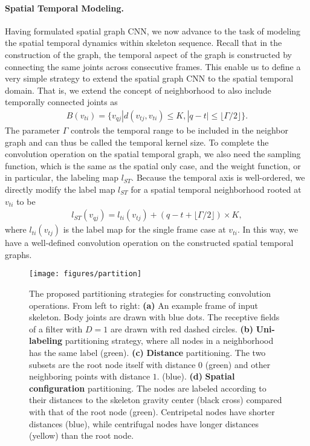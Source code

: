 \documentclass[letterpaper]{article} \usepackage{aaai18}  \usepackage{times}  \usepackage{helvet}  \usepackage{courier}  \usepackage{url}  \usepackage{graphicx}
\begin{document}
\paragraph{Spatial Temporal Modeling.}
Having formulated spatial graph CNN, we now advance to the task of modeling the spatial temporal dynamics within skeleton sequence.
Recall that in the construction of the graph, the temporal aspect of the graph is constructed by connecting the same joints across consecutive frames.
This enable us to define a very simple strategy to extend the spatial graph CNN to the spatial temporal domain. 
That is, we extend the concept of neighborhood to also include temporally connected joints as
\begin{align}\label{eq:neighbor_temp}
	 B(v_{ti})=\{v_{qj} | d(v_{tj}, v_{ti}) \leq K, |q - t| \leq \lfloor\Gamma/2\rfloor \}.
\end{align}
The parameter $ \Gamma $ controls the temporal range to be included in the neighbor graph and can thus be called the temporal kernel size.
To complete the convolution operation on the spatial temporal graph, we also need the sampling function, which is the same as the spatial only case, and the weight function, or in particular, the labeling map $ l_{ST} $. 
Because the temporal axis is well-ordered, we directly modify the label map $ l_{ST} $ for a spatial temporal neighborhood rooted at $ v_{ti}$ to be
\begin{align}\label{eq:spatial_to_temporal}
	l_{ST}(v_{qj}) = l_{ti}(v_{tj}) + (q - t + \lfloor\Gamma/2\rfloor) \times K,
\end{align}
where $ l_{ti}(v_{tj}) $ is the label map for the single frame case at $ v_{ti} $.
In this way, we have a well-defined convolution operation on the constructed spatial temporal graphs.

\begin{figure*}
	\centering
	\texttt{[image: figures/partition]}
	\caption{The proposed partitioning strategies for constructing convolution operations. 
		From left to right: 
		\textbf{(a)} An example frame of input skeleton. Body joints are drawn with blue dots. The receptive fields of a filter with $ D=1 $ are drawn with red dashed circles. 
		\textbf{(b)} \textbf{Uni-labeling} partitioning strategy, where all nodes in a neighborhood has the same label (green).
		\textbf{(c)} \textbf{Distance} partitioning. The two subsets are the root node itself with distance $0$ (green) and other neighboring points with distance $1$. (blue).
		\textbf{(d)} \textbf{Spatial configuration} partitioning. The nodes are labeled according to their distances to the skeleton gravity center (black cross) compared with that of the root node (green).
		Centripetal nodes have shorter distances (blue), while centrifugal nodes have longer distances (yellow) than the root node.
	}
	\label{fig:partition}
\end{figure*}
\end{document}
